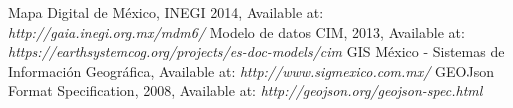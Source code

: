 \begin{thebibliography}{1}
		Mapa Digital de México, INEGI 2014, Available at: {\em http://gaia.inegi.org.mx/mdm6/}
	   Modelo de datos CIM, 2013, Available at: {\em https://earthsystemcog.org/projects/es-doc-models/cim}
		 GIS México - Sistemas de Información Geográfica, Available at: {\em http://www.sigmexico.com.mx/}
	     GEOJson Format Specification, 2008, Available at: {\em http://geojson.org/geojson-spec.html}
\end{thebibliography}